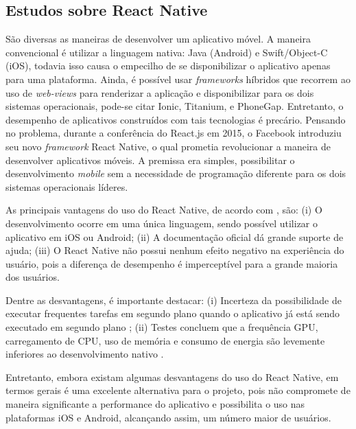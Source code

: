 \subsection{Estudos sobre React Native} 
São diversas as maneiras de desenvolver um aplicativo móvel. A maneira convencional é utilizar a linguagem nativa: Java (Android) e Swift/Object-C (iOS), todavia isso causa o empecilho de se disponibilizar o aplicativo apenas para uma plataforma. Ainda, é possível usar \textit{frameworks} híbridos que recorrem ao uso de \textit{web-views} para renderizar a aplicação e disponibilizar para os dois sistemas operacionais, pode-se citar Ionic, Titanium, e PhoneGap. Entretanto, o desempenho de aplicativos construídos com tais tecnologias é precário. Pensando no problema, durante a conferência do React.js em 2015, o Facebook introduziu seu novo \textit{framework} React Native, o qual prometia revolucionar a maneira de desenvolver aplicativos móveis. A premissa era simples, possibilitar o desenvolvimento \textit{mobile} sem a necessidade de programação diferente para os dois sistemas operacionais líderes.

As principais vantagens do uso do React Native, de acordo com \cite{danielsson2016}, são: (i) O desenvolvimento ocorre em uma única linguagem, sendo possível utilizar o aplicativo em iOS ou Android; (ii) A documentação oficial dá grande suporte de ajuda; (iii) O React Native não possui nenhum efeito negativo na experiência do usuário, pois a diferença de desempenho é imperceptível para a grande maioria dos usuários.

Dentre as desvantagens, é importante destacar: (i) Incerteza da possibilidade de executar frequentes tarefas em segundo plano quando o aplicativo já está sendo executado em segundo plano \citep{sodebergJohansson}; (ii) Testes concluem que a frequência GPU, carregamento de CPU, uso de memória e consumo de energia são levemente inferiores ao desenvolvimento nativo \citep{danielsson2016}.

Entretanto, embora existam algumas desvantagens do uso do React Native, em termos gerais é uma excelente alternativa para o projeto, pois não compromete de maneira significante a performance do aplicativo e possibilita o uso nas plataformas iOS e Android, alcançando assim, um número maior de usuários.

